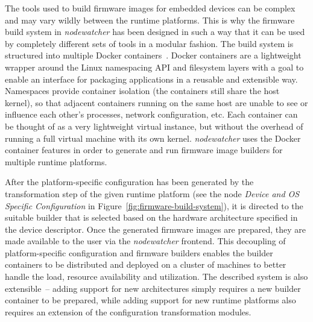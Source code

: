 \documentclass[5p,sort&compress]{elsarticle}
\newcommand{\nodewatcher}{\textit{nodewatcher}}
\begin{document}
The tools used to build firmware images for embedded devices can be complex and may vary wildly between the runtime platforms.
This is why the firmware build system in \nodewatcher{} has been designed in such a way that it can be used by completely different sets of tools in a modular fashion.
The build system is structured into multiple Docker containers~\cite{Docker_2013}. Docker containers are a lightweight wrapper around the Linux namespacing API and filesystem layers with a goal to enable an interface for packaging applications in a reusable and extensible way. Namespaces provide container isolation (the containers still share the host kernel), so that adjacent containers running on the same host are unable to see or influence each other's processes, network configuration, etc. Each container can be thought of as a very lightweight virtual instance, but without the overhead of running a full virtual machine with its own kernel.
\nodewatcher{} uses the Docker container features in order to generate and run firmware image builders for multiple runtime platforms.

After the platform-specific configuration has been generated by the transformation step of the given runtime platform (see the node \textit{Device and OS Specific Configuration} in Figure~\ref{fig:firmware-build-system}), it is directed to the suitable builder that is selected based on the hardware architecture specified in the device descriptor.
Once the generated firmware images are prepared, they are made available to the user via the \nodewatcher{} frontend. This decoupling of platform-specific configuration and firmware builders enables the builder containers to be distributed and deployed on a cluster of machines to better handle the load, resource availability and utilization.
The described system is also extensible~-- adding support for new architectures simply requires a new builder container to be prepared, while adding support for new runtime platforms also requires an extension of the configuration transformation modules.
\end{document}
